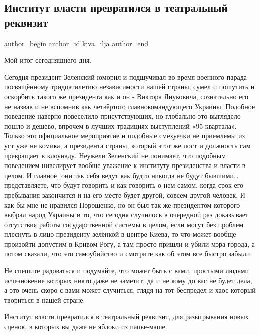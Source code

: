  
 
 
 
 
 
\subsection{Институт власти превратился в театральный реквизит}
\label{sec:24_08_2021.fb.kiva_ilja.1.institut_vlasti}
 
\ifcmt
 author_begin
   author_id kiva_ilja
 author_end
\fi

Мой итог сегодняшнего дня. 

Сегодня президент Зеленский юморил и подшучивал во время военного парада
посвящённому тридцатилетию независимости нашей страны, сумел и пошутить и
оскорбить такого же президента как и он -  Виктора Януковича, сознательно его
не назвав и не вспомнив как четвёртого главнокомандующего Украины. Подобное
поведение наверно повеселило присутствующих,  но глобально это выглядело пошло
и дёшево, впрочем в лучших традициях выступлений «95 квартала». Только  это
официальное мероприятие и подобные смехуечки не приемлемы из уст уже не комика,
а президента страны, который этот же пост и должность сам превращает в
клоунаду. Неужели Зеленский не понимает, что подобным поведением нивелирует
вообще уважение к институту президенства и власти в целом. И главное, они так
себя ведут как будто никогда не будут бывшими… представляете, что будут
говорить и как говорить о нем самом,  когда срок его пребывания закончится и на
его месте будет другой, совсем другой человек. И как бы мне не нравился
Порошенко, но он был так же президентом которого выбрал народ Украины и то, что
сегодня случилось в очередной раз доказывает отсутствия работы государственной
системы в целом, если могут без проблем плеснуть в лицо президенту зелёнкой в
центре Киева, то что может вообще произойти допустим в Кривом Рогу, а там
просто пришли и убили мэра города, а потом сказали, что это самоубийство и
смотрите как об этом все быстро забыли. 

Не спешите радоваться и подумайте, что может быть с вами, простыми людьми
исчезновение которых никто даже не заметит, да и не кому до вас не будет дела,
а это очень скоро с вами может случиться, глядя на тот беспредел и хаос который
твориться в нашей стране. 

Институт власти превратился в театральный реквизит, для разыгрывания новых
сценок, в которых вы даже не яблоки из папье-маше.
